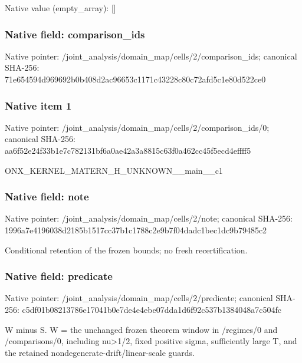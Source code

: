 \documentclass[10pt,a4paper]{article}
\begin{document}
Native value (empty\_\allowbreak{}array): []

\subsubsection{Native field: comparison\_\allowbreak{}ids}
Native pointer: /joint\_\allowbreak{}analysis/domain\_\allowbreak{}map/cells/2/comparison\_\allowbreak{}ids; canonical SHA-256: 71e654594d969692b0b408d2ac96653c1171c43228c80c72afd5c1e80d522ce0

\subsubsection{Native item 1}
Native pointer: /joint\_\allowbreak{}analysis/domain\_\allowbreak{}map/cells/2/comparison\_\allowbreak{}ids/0; canonical SHA-256: aa6f52e24f33b1e7c782131bf6a0ae42a3a8815c63f0a462cc45f5ecd4effff5

\begingroup\raggedright\sloppy ONX\_\allowbreak{}KERNEL\_\allowbreak{}MATERN\_\allowbreak{}H\_\allowbreak{}UNKNOWN\_\allowbreak{}\_\allowbreak{}main\_\allowbreak{}\_\allowbreak{}c1\par\endgroup

\subsubsection{Native field: note}
Native pointer: /joint\_\allowbreak{}analysis/domain\_\allowbreak{}map/cells/2/note; canonical SHA-256: 1996a7e4196038d2185b1517cc37b1c1788c2e9b7f04dadc1bec1dc9b79485c2

\begingroup\raggedright\sloppy Conditional retention of the frozen bounds;\allowbreak{} no fresh recertification.\par\endgroup

\subsubsection{Native field: predicate}
Native pointer: /joint\_\allowbreak{}analysis/domain\_\allowbreak{}map/cells/2/predicate; canonical SHA-256: c5df01b08213786e17041b0e7de4e4ebe07dda1d6f92c537b1384048a7c504fc

\begingroup\raggedright\sloppy W minus S. W =\allowbreak{} the unchanged frozen theorem window in /\allowbreak{}regimes/\allowbreak{}0 and /\allowbreak{}comparisons/\allowbreak{}0,\allowbreak{} including nu>1/\allowbreak{}2,\allowbreak{} fixed positive sigma,\allowbreak{} sufficiently large T,\allowbreak{} and the retained nondegenerate-drift/\allowbreak{}linear-scale guards.\par\endgroup
\end{document}
